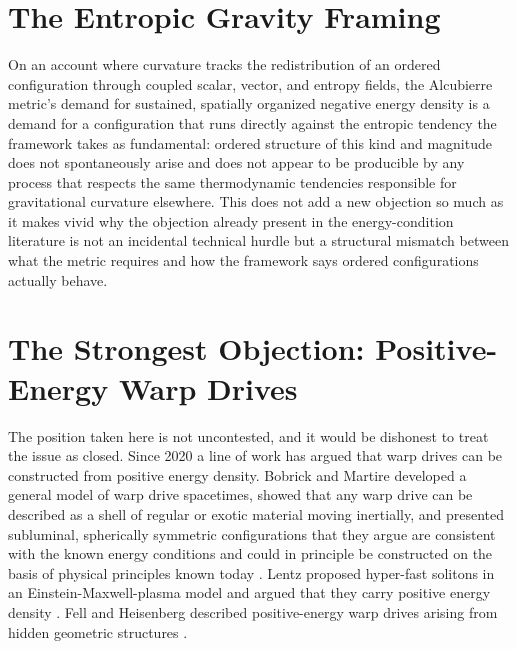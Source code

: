 \documentclass[11pt]{article}
\begin{document}
\section{The Entropic Gravity Framing}

On an account where curvature tracks the redistribution of an ordered configuration through coupled scalar, vector, and entropy fields, the Alcubierre metric's demand for sustained, spatially organized negative energy density is a demand for a configuration that runs directly against the entropic tendency the framework takes as fundamental: ordered structure of this kind and magnitude does not spontaneously arise and does not appear to be producible by any process that respects the same thermodynamic tendencies responsible for gravitational curvature elsewhere. This does not add a new objection so much as it makes vivid why the objection already present in the energy-condition literature is not an incidental technical hurdle but a structural mismatch between what the metric requires and how the framework says ordered configurations actually behave.

\section{The Strongest Objection: Positive-Energy Warp Drives}

The position taken here is not uncontested, and it would be dishonest to treat the issue as closed. Since 2020 a line of work has argued that warp drives can be constructed from positive energy density. Bobrick and Martire developed a general model of warp drive spacetimes, showed that any warp drive can be described as a shell of regular or exotic material moving inertially, and presented subluminal, spherically symmetric configurations that they argue are consistent with the known energy conditions and could in principle be constructed on the basis of physical principles known today \cite{BM2021}. Lentz proposed hyper-fast solitons in an Einstein-Maxwell-plasma model and argued that they carry positive energy density \cite{L2021}. Fell and Heisenberg described positive-energy warp drives arising from hidden geometric structures \cite{FH2021}.
\end{document}

